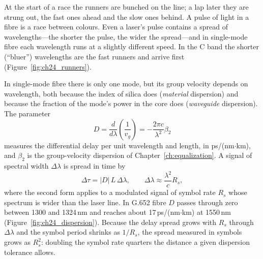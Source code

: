 At the start of a race the runners are bunched on the line; a lap later they are strung out, the
fast ones ahead and the slow ones behind. A pulse of light in a fibre is a race between colours.
Even a laser's pulse contains a spread of wavelengths---the shorter the pulse, the wider the
spread---and in single-mode fibre each wavelength runs at a slightly different speed. In the C band
the shorter (``bluer'') wavelengths are the fast runners and arrive first (Figure~\ref{fig:ch24_runners}).


In single-mode fibre there is only one mode, but its group velocity depends on wavelength, both because
the index of silica does (\emph{material} dispersion) and because the fraction of the mode's power in the
core does (\emph{waveguide} dispersion). The  parameter
\begin{equation}
D=\frac{d}{d\lambda}\left(\frac{1}{v_g}\right)=-\frac{2\pi c}{\lambda^2}\beta_2
\label{eq:ch24:D}
\end{equation}
measures the differential delay per unit wavelength and length, in ps/(nm$\cdot$km), and $\beta_2$ is the
group-velocity dispersion of Chapter~\ref{ch:equalization}. A signal of spectral width $\Delta\lambda$ is
spread in time by
\begin{equation}
\Delta\tau=|D|\,L\,\Delta\lambda,\qquad \Delta\lambda\approx\frac{\lambda^2}{c}R_s,
\label{eq:ch24:spread}
\end{equation}
where the second form applies to a modulated signal of symbol rate $R_s$ whose spectrum is wider than the
laser line. In G.652 fibre $D$ passes through zero between 1300 and 1324\,nm and reaches about
17\,ps/(nm$\cdot$km) at 1550\,nm (Figure~\ref{fig:ch24_dispersion}). Because the delay spread grows with
$R_s$ through $\Delta\lambda$ and the symbol period shrinks as $1/R_s$, the spread measured in symbols grows
as $R_s^2$: doubling the symbol rate quarters the distance a given dispersion tolerance allows.


